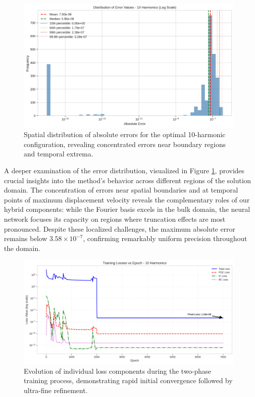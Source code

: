 \begin{figure}[ht]
    \centering
    \includegraphics[width = 1.0\linewidth]{figures/error_distribution_10h.png}
    \caption{Spatial distribution of absolute errors for the optimal 10-harmonic configuration, revealing concentrated errors near boundary regions and temporal extrema.}
    \label{fig:error_dist}
\end{figure}

A deeper examination of the error distribution, visualized in Figure \ref{fig:error_dist}, provides crucial insights into the method's behavior across different regions of the solution domain. The concentration of errors near spatial boundaries and at temporal points of maximum displacement velocity reveals the complementary roles of our hybrid components: while the Fourier basis excels in the bulk domain, the neural network focuses its capacity on regions where truncation effects are most pronounced. Despite these localized challenges, the maximum absolute error remains below $3.58 \times 10^{-7}$, confirming remarkably uniform precision throughout the domain.

\begin{figure}[ht]
    \centering
    \includegraphics[width = 1.0\linewidth]{figures/training_losses_10h.png}
    \caption{Evolution of individual loss components during the two-phase training process, demonstrating rapid initial convergence followed by ultra-fine refinement.}
    \label{fig:training_losses}
\end{figure}

